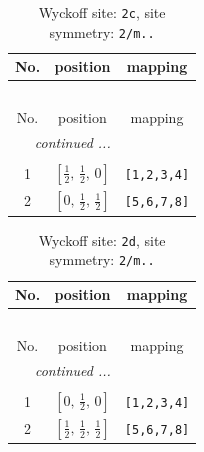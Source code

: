 \documentclass[fleqn,8pt]{jsarticle}
\begin{document}
\begin{longtable}{ccc}
\caption{Wyckoff site: {\tt 2c}, site symmetry: {\tt 2/m..}}
 \\
 \hline \hline
No. & position & mapping \\ \hline \endfirsthead

\multicolumn{2}{l}{\tablename\ \thetable{}} \\
 \hline \hline
No. & position & mapping \\ \hline \endhead

 \hline \hline
\multicolumn{2}{r}{\footnotesize\it continued ...} \\ \endfoot

 \hline \hline
\multicolumn{2}{r}{} \\ \endlastfoot

1 & $\left[ \frac{1}{2},\, \frac{1}{2},\, 0 \right]$ & {\tt [1,2,3,4]} \\ \hline
2 & $\left[ 0,\, \frac{1}{2},\, \frac{1}{2} \right]$ & {\tt [5,6,7,8]} \\
\end{longtable}
\renewcommand{\arraystretch}{1.2}
\begin{longtable}{ccc}
\caption{Wyckoff site: {\tt 2d}, site symmetry: {\tt 2/m..}}
 \\
 \hline \hline
No. & position & mapping \\ \hline \endfirsthead

\multicolumn{2}{l}{\tablename\ \thetable{}} \\
 \hline \hline
No. & position & mapping \\ \hline \endhead

 \hline \hline
\multicolumn{2}{r}{\footnotesize\it continued ...} \\ \endfoot

 \hline \hline
\multicolumn{2}{r}{} \\ \endlastfoot

1 & $\left[ 0,\, \frac{1}{2},\, 0 \right]$ & {\tt [1,2,3,4]} \\ \hline
2 & $\left[ \frac{1}{2},\, \frac{1}{2},\, \frac{1}{2} \right]$ & {\tt [5,6,7,8]} \\
\end{longtable}
\renewcommand{\arraystretch}{1.2}
\end{document}
